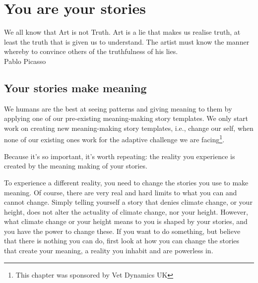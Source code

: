 \chapter{You are your stories}
\label{chapter:who-am-i-meaning}


\begin{chapterquotation}
We all know that Art is not Truth. Art is a lie that makes us realise truth, at least the truth that is given us to understand. The artist must know the manner whereby to convince others of the truthfulness of his lies. \\
\raggedleft\textemdash Pablo Picasso
\end{chapterquotation}


\section{Your stories make meaning}
We humans are the best at seeing patterns and giving meaning to them by applying one of our pre-existing meaning-making story  templates. We only start work on creating new meaning-making story templates, i.e., change our self, when none of our existing ones work for the adaptive challenge we are facing\footnote{This chapter was sponsored by Vet Dynamics UK}. 


Because it's so important, it's worth repeating: the reality you experience is created by the meaning making of your stories.


To experience a different reality, you need to change the stories you use to make meaning. Of course, there are very real and hard limits to what you can and cannot change. Simply telling yourself a story that denies climate change, or your height, does not alter the actuality of climate change, nor your height. However, what climate change or your height means to you is shaped by your stories, and you have the power to change these. If you want to do something, but believe that there is nothing you can do, first look at how you can change the stories that create your meaning, a reality you inhabit and are powerless in.


